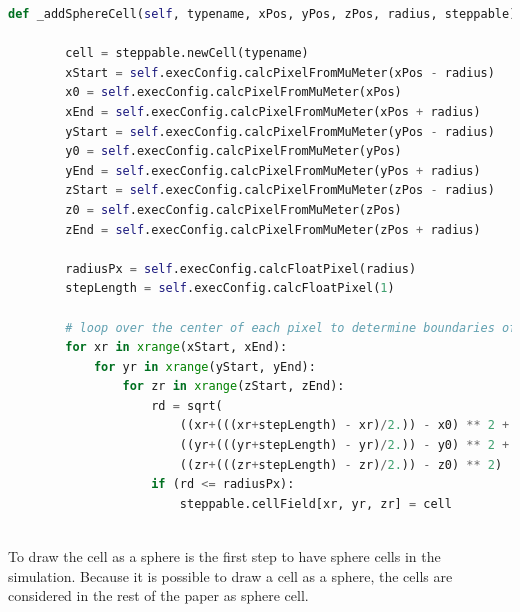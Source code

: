 \begin{lstlisting}[language=Python, caption = {[Created function to draw a sphere cell] Function to draw a cell as a sphere. First all required points for the calculation are converted into the voxel unit. Then it is iterated over each of the three axis. During these iterations for each voxel the distance to the center of the cuboid and sphere is calculated and then it is checked if the voxel is within the sphere or not. If the voxel is a part of the sphere it will be added to the sphere.}, label=lst:addSphereCell]
    def _addSphereCell(self, typename, xPos, yPos, zPos, radius, steppable):
    
        cell = steppable.newCell(typename)
        xStart = self.execConfig.calcPixelFromMuMeter(xPos - radius)
        x0 = self.execConfig.calcPixelFromMuMeter(xPos)
        xEnd = self.execConfig.calcPixelFromMuMeter(xPos + radius)
        yStart = self.execConfig.calcPixelFromMuMeter(yPos - radius)
        y0 = self.execConfig.calcPixelFromMuMeter(yPos)
        yEnd = self.execConfig.calcPixelFromMuMeter(yPos + radius)
        zStart = self.execConfig.calcPixelFromMuMeter(zPos - radius)
        z0 = self.execConfig.calcPixelFromMuMeter(zPos)
        zEnd = self.execConfig.calcPixelFromMuMeter(zPos + radius)

        radiusPx = self.execConfig.calcFloatPixel(radius)
        stepLength = self.execConfig.calcFloatPixel(1)
        
        # loop over the center of each pixel to determine boundaries of the circle
        for xr in xrange(xStart, xEnd):
            for yr in xrange(yStart, yEnd):
                for zr in xrange(zStart, zEnd):
                    rd = sqrt(
                        ((xr+(((xr+stepLength) - xr)/2.)) - x0) ** 2 +
                        ((yr+(((yr+stepLength) - yr)/2.)) - y0) ** 2 +
                        ((zr+(((zr+stepLength) - zr)/2.)) - z0) ** 2)
                    if (rd <= radiusPx):
                        steppable.cellField[xr, yr, zr] = cell
                        
\end{lstlisting}

To draw the cell as a sphere is the first step to have sphere cells in the simulation. Because it is possible to draw a cell as a sphere, the cells are considered in the rest of the paper as sphere cell. 


